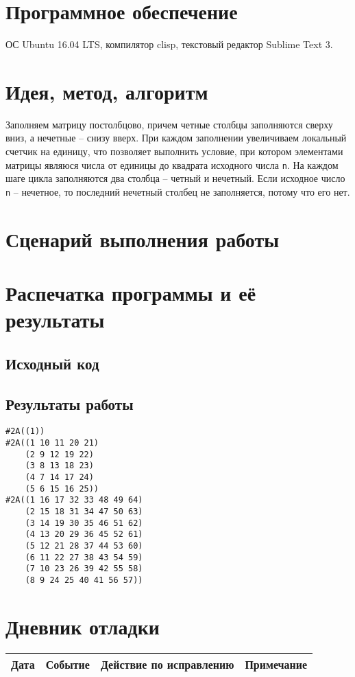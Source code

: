 \documentclass[12pt]{article}
\begin{document}
\section{Программное обеспечение}
ОС Ubuntu 16.04 LTS, компилятор clisp, текстовый редактор Sublime Text 3.

\section{Идея, метод, алгоритм}
Заполняем матрицу постолбцово, причем четные столбцы заполняются сверху вниз, а нечетные -- снизу вверх. При каждом заполнении увеличиваем локальный счетчик на единицу, что позволяет выполнить условие, при котором элементами матрицы являюся числа от единицы до квадрата исходного числа {\tt n}. На каждом шаге цикла заполняются два столбца -- четный и нечетный. Если исходное число {\tt n} -- нечетное, то последний нечетный столбец не заполняется, потому что его нет.

\section{Сценарий выполнения работы}

\section{Распечатка программы и её результаты}

\subsection{Исходный код}


\subsection{Результаты работы}
\begin{lstlisting}
#2A((1)) 
#2A((1 10 11 20 21)
    (2 9 12 19 22)
    (3 8 13 18 23)
    (4 7 14 17 24)
    (5 6 15 16 25)) 
#2A((1 16 17 32 33 48 49 64)
    (2 15 18 31 34 47 50 63)
    (3 14 19 30 35 46 51 62)
    (4 13 20 29 36 45 52 61)
    (5 12 21 28 37 44 53 60)
    (6 11 22 27 38 43 54 59)
    (7 10 23 26 39 42 55 58)
    (8 9 24 25 40 41 56 57))
\end{lstlisting}

\section{Дневник отладки}
\begin{tabular}{|p{50pt}|p{130pt}|p{130pt}|p{70pt}|}
\hline
Дата & Событие & Действие по исправлению & Примечание\\
\hline
\end{tabular}
\end{document}
